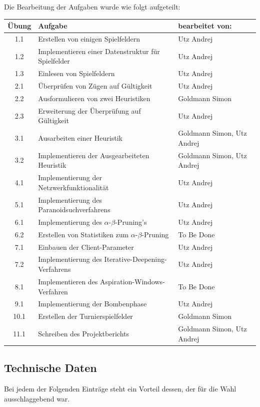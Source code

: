 \documentclass[12pt,a4paper]{article}
\begin{document}
Die Bearbeitung der Aufgaben wurde wie folgt aufgeteilt:\newline
\begin{tabular}{|c|l|l|}
	\hline
	Übung & Aufgabe & bearbeitet von:\\
	\hline
	1.1 & Erstellen von einigen Spielfeldern & Utz Andrej\\
	1.2 & Implementieren einer Datenstruktur für Spielfelder & Utz Andrej\\
	1.3 & Einlesen von Spielfeldern & Utz Andrej\\
	\hline
	2.1 & Überprüfen von Zügen auf Gültigkeit & Utz Andrej\\
	2.2 & Ausformulieren von zwei Heuristiken & Goldmann Simon\\
	2.3 & Erweiterung der Überprüfung auf Gültigkeit & Utz Andrej\\
	\hline
	3.1 & Ausarbeiten einer Heuristik & Goldmann Simon, Utz Andrej\\
	3.2 & Implementieren der Ausgearbeiteten Heuristik & Goldmann Simon, Utz Andrej\\
	\hline
	4.1 & Implementierung der Netzwerkfunktionalität & Utz Andrej\\
	\hline
	5.1 & Implementierung des Paranoidsuchverfahrens & Utz Andrej\\
	\hline
	6.1 & Implementierung des $\alpha$-$\beta$-Pruning's & Utz Andrej\\
	6.2 & Erstellen von Statistiken zum $\alpha$-$\beta$-Pruning & To Be Done\\
	\hline
	7.1 & Einbauen der Client-Parameter & Utz Andrej\\
	7.2 & Implementierung des Iterative-Deepening-Verfahrens & Utz Andrej\\
	\hline
	8.1 & Implementieren des Aspiration-Windows-Verfahren & To Be Done\\
	\hline
	9.1 & Implementierung der Bombenphase & Utz Andrej\\
	\hline
	10.1 & Erstellen der Turnierspielfelder & Goldmann Simon\\
	\hline
	11.1 & Schreiben des Projektberichts & Goldmann Simon, Utz Andrej\\
	\hline
\end{tabular}
\newpage

\subsection{Technische Daten}
Bei jedem der Folgenden Einträge steht ein Vorteil dessen, der für die Wahl ausschlaggebend war.
\end{document}
